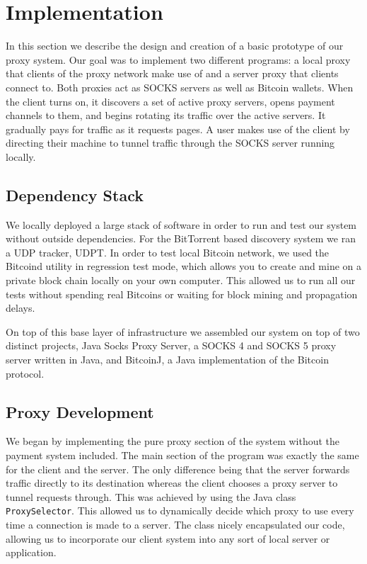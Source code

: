 \section{Implementation}
\label{sec:eval}

In this section we describe the design and creation of a basic prototype of our proxy system. Our goal was to implement two different programs: a local proxy that clients of the proxy network make use of and a server proxy that clients connect to. Both proxies act as SOCKS servers as well as Bitcoin wallets. When the client turns on, it discovers a set of active proxy servers, opens payment channels to them, and begins rotating its traffic over the active servers. It gradually pays for traffic as it requests pages. A user makes use of the client by directing their machine to tunnel traffic through the SOCKS server running locally.

\subsection{Dependency Stack}
We locally deployed a large stack of software in order to run and test our system without outside dependencies. For the BitTorrent based discovery system we ran a UDP tracker, UDPT. In order to test local Bitcoin network, we used the Bitcoind utility in regression test mode, which allows you to create and mine on a private block chain locally on your own computer. This allowed us to run all our tests without spending real Bitcoins or waiting for block mining and propagation delays. 

On top of this base layer of infrastructure we assembled our system on top of two distinct projects, Java Socks Proxy Server, a SOCKS 4 and SOCKS 5 proxy server written in Java, and BitcoinJ, a Java implementation of the Bitcoin protocol.

\subsection{Proxy Development}
We began by implementing the pure proxy section of the system without the payment system included. The main section of the program was exactly the same for the client and the server. The only difference being that the server forwards traffic directly to its destination whereas the client chooses a proxy server to tunnel requests through. This was achieved by using the Java class \texttt{ProxySelector}. This allowed us to dynamically decide which proxy to use every time a connection is made to a server. The class nicely encapsulated our code, allowing us to incorporate our client system into any sort of local server or application.


